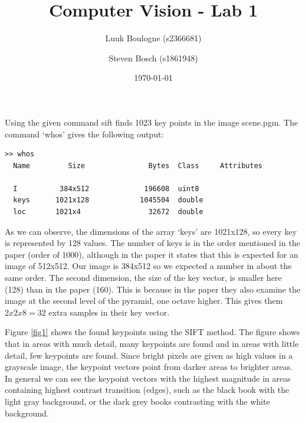 \documentclass{article}
\title{Computer Vision - Lab 1}
\author{Luuk Boulogne (s2366681) \and Steven Bosch (s1861948)}
\date{\today}
\begin{document}
\maketitle

\subsection{}
Using the given command sift finds 1023 key points in the image scene.pgm. The command `whos' gives the following output:
\begin{lstlisting}
>> whos
  Name         Size               Bytes  Class     Attributes

  I          384x512             196608  uint8               
  keys      1021x128            1045504  double              
  loc       1021x4                32672  double    
\end{lstlisting}
As we can observe, the dimensions of the array `keys' are 1021x128, so every key is represented by 128 values. 
The number of keys is in the order mentioned in the paper (order of 1000), although in the paper it states that this is expected for an image of 512x512. Our image is 384x512 so we expected a number in about the same order. The second dimension, the size of the key vector, is smaller here (128) than in the paper (160). This is because in the paper they also examine the image at the second level of the pyramid, one octave higher. This gives them $2x2x8 = 32$ extra samples in their key vector.

Figure \ref{fig1} shows the found keypoints using the SIFT method. The figure shows that in areas with much detail, many keypoints are found and in areas with little detail, few keypoints are found. Since bright pixels are given as high values in a grayscale image, the keypoint vectors point from darker areas to brighter areas. In general we can see the keypoint vectors with the highest magnitude in areas containing highest contrast transition (edges), such as the black book with the light gray background, or the dark grey books contrasting with the white background. 
\end{document}

